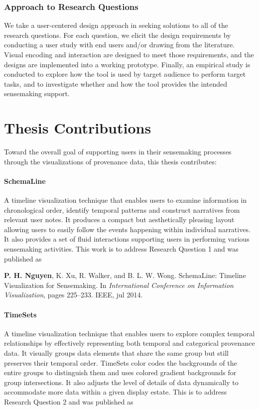 \subsubsection*{\textbf{Approach to Research Questions}}
We take a user-centered design approach in seeking solutions to all of the research questions. For each question, we elicit the design requirements by conducting a user study with end users and/or drawing from the literature. Visual encoding and interaction are designed to meet those requirements, and the designs are implemented into a working prototype. Finally, an empirical study is conducted to explore how the tool is used by target audience to perform target tasks, and to investigate whether and how the tool provides the intended sensemaking support.

\section{Thesis Contributions}
Toward the overall goal of supporting users in their sensemaking processes through the visualizations of provenance data, this thesis contributes:

\paragraph{SchemaLine} A timeline visualization technique that enables users to examine information in chronological order, identify temporal patterns and construct narratives from relevant user notes. It produces a compact but aesthetically pleasing layout allowing users to easily follow the events happening within individual narratives. It also provides a set of fluid interactions supporting users in performing various sensemaking activities. This work is to address Research Question 1 and was published as

\textbf{P. H. Nguyen}, K. Xu, R. Walker, and B. L. W. Wong. SchemaLine: Timeline Visualization for Sensemaking. In \textit{International Conference on Information Visualization}, pages 225--233. IEEE, jul 2014.

\paragraph{TimeSets} A timeline visualization technique that enables users to explore complex temporal relationships by effectively representing both temporal and categorical provenance data. It visually groups data elements that share the same group but still preserves their temporal order. TimeSets color codes the backgrounds of the entire groups to distinguish them and uses colored gradient backgrounds for group intersections. It also adjusts the level of details of data dynamically to accommodate more data within a given display estate. This is to address Research Question 2 and was published as

